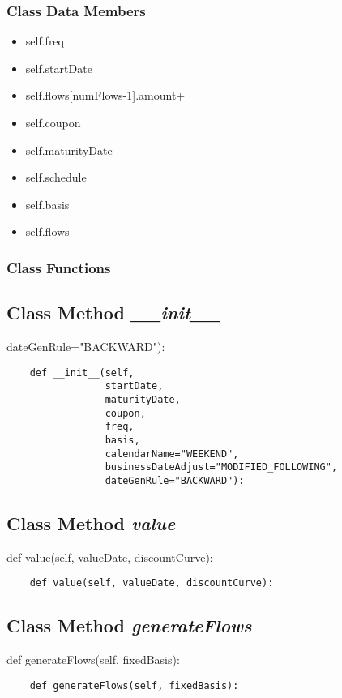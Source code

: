 \documentclass[twoside,11pt]{book}
\begin{document}
\subsubsection{Class Data Members}
\begin{itemize}
\item{self.freq}
\item{self.startDate}
\item{self.flows[numFlows-1].amount+}
\item{self.coupon}
\item{self.maturityDate}
\item{self.schedule}
\item{self.basis}
\item{self.flows}
\end{itemize}

\subsubsection{Class Functions}

\subsection{Class Method {\it \_\_init\_\_}}
dateGenRule="BACKWARD"):

\begin{lstlisting}
    def __init__(self,
                 startDate,
                 maturityDate,
                 coupon,
                 freq,
                 basis,
                 calendarName="WEEKEND",
                 businessDateAdjust="MODIFIED_FOLLOWING",
                 dateGenRule="BACKWARD"):
\end{lstlisting}

\subsection{Class Method {\it value}}
def value(self, valueDate, discountCurve):

\begin{lstlisting}
    def value(self, valueDate, discountCurve):
\end{lstlisting}

\subsection{Class Method {\it generateFlows}}
def generateFlows(self, fixedBasis):

\begin{lstlisting}
    def generateFlows(self, fixedBasis):
\end{lstlisting}
\end{document}
